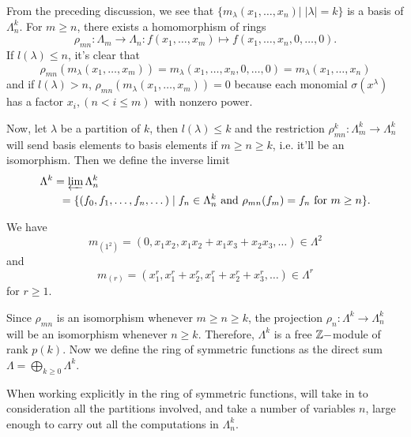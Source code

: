 From the preceding discussion, we see that $\{m_\lambda(x_1,\dots,x_n)|\;|\lambda|=k\}$ is a basis of $\Lambda_n^k$. For $m\geq n$, 
there exists a homomorphism of rings
\begin{equation}
    \rho_{mn}:\Lambda_m\rightarrow \Lambda_n: f(x_1,\dots,x_m)\mapsto f(x_1,\dots,x_n,0,\dots,0).
\end{equation}
If $l(\lambda)\leq n$, it's clear that
\begin{equation}
\rho_{mn}(m_\lambda(x_1,\dots,x_m))=m_\lambda(x_1,\dots,x_n,0,\dots,0)=m_\lambda(x_1,\dots,x_n)
\end{equation}
and if $l(\lambda)>n$, $\rho_{mn}(m_\lambda(x_1,\dots,x_m))=0$ because each monomial $\sigma(x^\lambda)$ has a factor $x_i,(n<i\leq m)$ with nonzero power. \par
Now, let $\lambda$ be a partition of $k$, then $l(\lambda)\leq k$ and the restriction $\rho_{mn}^k: \Lambda_m^k\rightarrow\Lambda_n^k$ will send basis elements to basis elements if $m\geq n\geq k$, i.e. it'll be an isomorphism. Then we define the inverse limit
\begin{equation}
\begin{split}
    \Lambda^k&=\varprojlim \Lambda_n^k\\
    &\;\;=\{(f_0,f_1,\dots,f_n,\dots)\;|\;f_n\in\Lambda_n^k\text{ and } \rho_{mn}(f_m)=f_n\text{ for }m\geq n\}.
\end{split}
\end{equation}
\begin{dang}
    \begin{example}
        We have
        \begin{equation}
            m_{(1^2)}=(0,x_1x_2, x_1x_2+x_1x_3+x_2x_3,\dots) \in \Lambda^2
        \end{equation}
        and
        \begin{equation}
            m_{(r)}=(x_1^r,x_1^r+x_2^r,x_1^r+x_2^r+x_3^r,\dots)\in\Lambda^r
        \end{equation}
        for $r\geq1$.
    \end{example}
\end{dang}
Since $\rho_{mn}$ is an isomorphism whenever $m\geq n\geq k$, the projection $\rho_n:\Lambda^k\rightarrow\Lambda_n^k$ will be an isomorphism whenever $n\geq k$. Therefore, $\Lambda^k$ is a free $\mathbb{Z}-$module of rank $p(k)$. Now we define the ring of symmetric functions as the direct sum $\Lambda=\bigoplus_{k\geq0}\Lambda^k$. \par
When working explicitly in the ring of symmetric functions, will take in to consideration all the partitions involved, and take a number of variables $n$, large enough to carry out all the computations in $\Lambda_n^k$.
